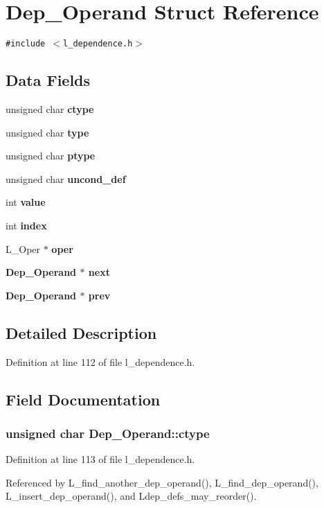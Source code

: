 \section{Dep\_\-Operand Struct Reference}
\label{structDep__Operand}
{\tt \#include $<$l\_\-dependence.h$>$}

\subsection*{Data Fields}
\begin{CompactItemize}
\item 
unsigned char \bf{ctype}
\item 
unsigned char \bf{type}
\item 
unsigned char \bf{ptype}
\item 
unsigned char \bf{uncond\_\-def}
\item 
int \bf{value}
\item 
int \bf{index}
\item 
L\_\-Oper $\ast$ \bf{oper}
\item 
\bf{Dep\_\-Operand} $\ast$ \bf{next}
\item 
\bf{Dep\_\-Operand} $\ast$ \bf{prev}
\end{CompactItemize}


\subsection{Detailed Description}




Definition at line 112 of file l\_\-dependence.h.

\subsection{Field Documentation}
\subsubsection{\setlength{\rightskip}{0pt plus 5cm}unsigned char \bf{Dep\_\-Operand::ctype}}\label{structDep__Operand_24282d5eb15a67425bcdedaefde24126}




Definition at line 113 of file l\_\-dependence.h.

Referenced by L\_\-find\_\-another\_\-dep\_\-operand(), L\_\-find\_\-dep\_\-operand(), L\_\-insert\_\-dep\_\-operand(), and Ldep\_\-defs\_\-may\_\-reorder().
